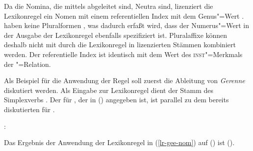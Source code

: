 \begin{comment}

The rule applies to all verbs. The valence properties of the nominalized verb
are ignored since this lexical rule licenses only the bare noun with a determiner
without any complements that could be inherited from the verb. Following 
\citet[Chapter~1]{ps2} and \citet{Demske2001a}, I assume that the noun selects a determiner,
\ie, I assume an NP analysis rather than a DP\is{determiner phrase}
analysis, but the rule in (\mex{0}) could be easily changed. For a DP
analysis in HPSG see \citew{Abb94}. A special variant of a DP analysis
can be found in \citew{Netter94} and \citew{Netter98-Eng}.
\end{comment}

Da die Nomina, die mittels \geen abgeleitet sind, Neutra sind, lizenziert
die Lexikonregel ein Nomen mit einem referentiellen Index mit dem Genus"=Wert .
\geenen haben keine Pluralformen \citep[]{Bierwisch89a}, was dadurch
erfaßt wird, dass der Numerus"=Wert in der Ausgabe der Lexikonregel ebenfalls
spezifiziert ist. Pluralaffixe können deshalb nicht mit durch die Lexikonregel
in   lizenzierten Stämmen kombiniert werden. 
Der referentielle Index  ist identisch mit dem Wert des \textsc{inst}"=Merkmals
der "=Relation.



Als Beispiel für die Anwendung der Regel soll zuerst die Ableitung von \emph{Gerenne} diskutiert
werden. Als Eingabe zur Lexikonregel dient der Stamm des Simplexverbs .
Der \locw für , der in () angegeben ist, ist parallel
zu dem bereits diskutierten für .

\eas
{}:\\
\zs

\noindent
Das Ergebnis der Anwendung der Lexikonregel in (\ref{lr-gee-nom}) auf ()
ist ().

